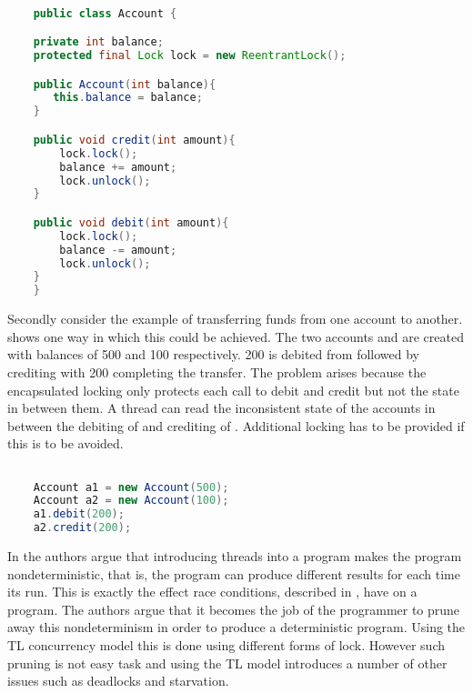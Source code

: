 \begin{lstlisting}[float,label=lst:account_example,
  caption={Encapsulated locking},
  language=Java,  
  showspaces=false,
  showtabs=false,
  breaklines=true,
  showstringspaces=false,
  breakatwhitespace=true,
  commentstyle=\color{greencomments},
  keywordstyle=\color{bluekeywords},
  stringstyle=\color{redstrings}]  % Start your code-block

	public class Account {

    private int balance;
    protected final Lock lock = new ReentrantLock();

    public Account(int balance){
       this.balance = balance;
    }

    public void credit(int amount){
        lock.lock();
        balance += amount;
        lock.unlock();
    }

    public void debit(int amount){
        lock.lock();
        balance -= amount;
        lock.unlock();
    }
	}
\end{lstlisting}

Secondly consider the example of transferring funds from one account to another.  shows one way in which this could be achieved. The two accounts  and  are created with balances of 500 and 100 respectively. 200 is debited from  followed by crediting  with 200 completing the transfer. The problem arises because the encapsulated locking only protects each call to debit and credit but not the state in between them\cite[p. 59]{sutter2005software}. A thread can read the inconsistent state of the accounts in between the debiting of  and crediting of . Additional locking has to be provided  if this is to be avoided.

\begin{lstlisting}[float,label=lst:account_example_transfer,
  caption={Funds transfer between two accounts},
  language=Java,  
  showspaces=false,
  showtabs=false,
  breaklines=true,
  showstringspaces=false,
  breakatwhitespace=true,
  commentstyle=\color{greencomments},
  keywordstyle=\color{bluekeywords},
  stringstyle=\color{redstrings}]  % Start your code-block

    Account a1 = new Account(500);
    Account a2 = new Account(100);
    a1.debit(200);
    a2.credit(200);
\end{lstlisting}

In \cite{lee2006problem} the authors argue that introducing threads into a program makes the program nondeterministic, that is, the program can produce different results for each time its run. This is exactly the effect race conditions, described in \cite{subsec:race_coditions}, have on a program. The authors argue that it becomes the job of the programmer to prune away this nondeterminism in order to produce a deterministic program. Using the \ac{TL} concurrency model this is done using different forms of lock. However such pruning is not easy task and using the \ac{TL} model introduces a number of other issues such as deadlocks and starvation.

